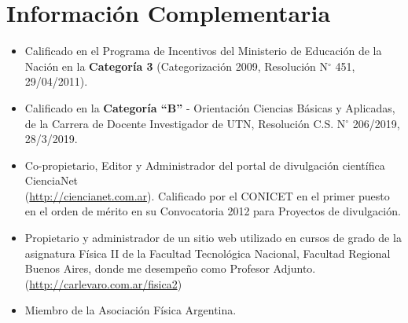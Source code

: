 \section{Información Complementaria}

\begin{itemize}
 \item Calificado en el Programa de Incentivos del Ministerio de Educación de la Nación en
la \textbf{Categoría 3} (Categorización 2009, Resolución N$^{\circ}$ 451, 29/04/2011).

\item Calificado en la \textbf{Categoría ``B''} - Orientación Ciencias Básicas y Aplicadas, de la Carrera de Docente Investigador de UTN, Resolución C.S. N$^{\circ}$ 206/2019, 28/3/2019.

\item Co-propietario, Editor y Administrador del portal de divulgación científica CienciaNet \\ (\href{http://ciencianet.com.ar}{http://ciencianet.com.ar}). Calificado por el CONICET en el primer puesto en el orden de mérito en su Convocatoria 2012 para Proyectos de divulgación.

\item Propietario y administrador de un sitio web utilizado en cursos de grado de la asignatura Física II de la Facultad Tecnológica Nacional, Facultad Regional Buenos Aires, donde me desempeño como Profesor Adjunto. (\href{http://carlevaro.com.ar/fisica2}{http://carlevaro.com.ar/fisica2})

\item Miembro de la Asociación Física Argentina.
\end{itemize}
